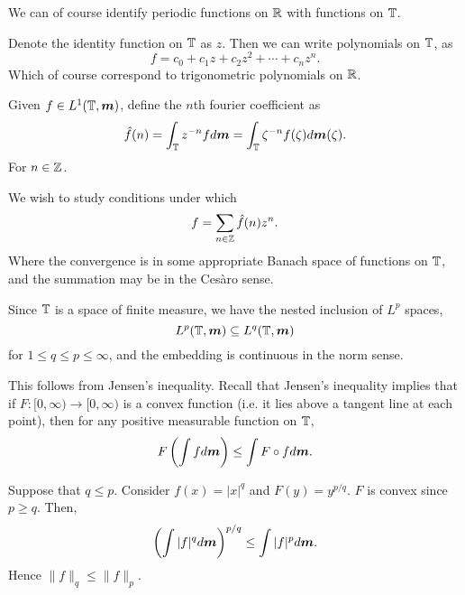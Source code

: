 \documentclass{owmaths}
\begin{document}
We can of course identify periodic functions on $\mathbb{R}$
with functions on $\mathbb{T}$. 

Denote the identity function on $\mathbb{T}$ as $z$. Then we
can write polynomials on $\mathbb{T}$, as
\begin{equation*}
    f = c_0 + c_1 z + c_2 z^2 + \cdots + c_n z^n.
\end{equation*}
Which of course correspond to trigonometric polynomials on $\mathbb{R}$. 

Given $f \in L^1(\mathbb{T},\boldsymbol{m})$, define the $n$th fourier coefficient as
\begin{equation*}
    \hat{f}(n) = \int_{\mathbb{T}} z^{-n}fd\boldsymbol{m} = \int_{\mathbb{T}} \zeta^{-n} f(\zeta)d\boldsymbol{m}(\zeta).
\end{equation*}
For $n \in \mathbb{Z}$.

We wish to study conditions under which
\begin{equation*}
    f = \sum_{n \in \mathbb{Z}} \hat{f}(n) z^n.
\end{equation*}
Where the convergence is in some appropriate Banach space of functions on $\mathbb{T}$,
and the summation may be in the Ces\`aro sense.

Since $\mathbb{T}$ is a space of finite measure, we have the nested inclusion
of $L^p$ spaces,
\begin{equation*}
    L^p(\mathbb{T},\boldsymbol{m}) \subseteq L^q(\mathbb{T},\boldsymbol{m})
\end{equation*}
for $1 \leq q \leq p \leq \infty$, and the embedding is continuous in the norm sense.

This follows from Jensen's inequality. Recall that Jensen's inequality implies
that if $F:[0,\infty)\rightarrow [0,\infty)$ is a convex function (i.e.
it lies above a tangent line at each point), then for any positive measurable function on $\mathbb{T}$,
\begin{equation*}
      F\left(\int f d\boldsymbol{m}\right)\leq\int F\circ f d\boldsymbol{m}.
\end{equation*}

Suppose that $q \leq p$. Consider $f(x) = |x|^q$ and $F(y) = y^{p/q}$. 
$F$ is convex since $p\geq q$. Then,
\begin{equation*}
    \left(\int |f|^qd\boldsymbol{m}\right)^{p/q} \leq \int |f|^pd\boldsymbol{m}.
\end{equation*}
Hence $\|f\|_q \leq \|f\|_p$. 
\end{document}
